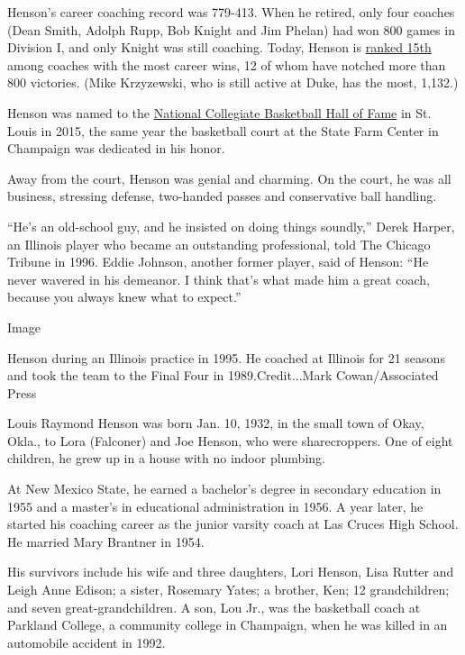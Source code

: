 Henson's career coaching record was 779-413. When he retired, only four
coaches (Dean Smith, Adolph Rupp, Bob Knight and Jim Phelan) had won 800
games in Division I, and only Knight was still coaching. Today, Henson
is
\href{https://www.ncaa.com/news/basketball-men/article/2019-07-29/mens-di-college-basketball-coaches-most-wins\#:~:text=MORE\%20CBB\%20RECORDS\%3A\%20The\%209,Jim\%20Boeheim\%20is\%20946-385.}{ranked
15th} among coaches with the most career wins, 12 of whom have notched
more than 800 victories. (Mike Krzyzewski, who is still active at Duke,
has the most, 1,132.)

Henson was named to the
\href{https://collegebasketballexperience.com/members/lou-henson/}{National
Collegiate Basketball Hall of Fame} in St. Louis in 2015, the same year
the basketball court at the State Farm Center in Champaign was dedicated
in his honor.

Away from the court, Henson was genial and charming. On the court, he
was all business, stressing defense, two-handed passes and conservative
ball handling.

``He's an old-school guy, and he insisted on doing things soundly,''
Derek Harper, an Illinois player who became an outstanding professional,
told The Chicago Tribune in 1996. Eddie Johnson, another former player,
said of Henson: ``He never wavered in his demeanor. I think that's what
made him a great coach, because you always knew what to expect.''

Image

Henson during an Illinois practice in 1995. He coached at Illinois for
21 seasons and took the team to the Final Four in 1989.Credit...Mark
Cowan/Associated Press

Louis Raymond Henson was born Jan. 10, 1932, in the small town of Okay,
Okla., to Lora (Falconer) and Joe Henson, who were sharecroppers. One of
eight children, he grew up in a house with no indoor plumbing.

At New Mexico State, he earned a bachelor's degree in secondary
education in 1955 and a master's in educational administration in 1956.
A year later, he started his coaching career as the junior varsity coach
at Las Cruces High School. He married Mary Brantner in 1954.

His survivors include his wife and three daughters, Lori Henson, Lisa
Rutter and Leigh Anne Edison; a sister, Rosemary Yates; a brother, Ken;
12 grandchildren; and seven great-grandchildren. A son, Lou Jr., was the
basketball coach at Parkland College, a community college in Champaign,
when he was killed in an automobile accident in 1992.

